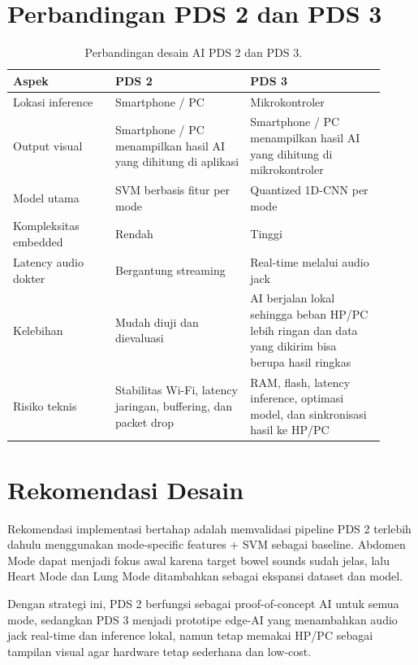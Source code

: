 \documentclass[12pt,a4paper]{article}
\begin{document}
\section{Perbandingan PDS 2 dan PDS 3}
\begin{table}[H]
\centering
\begin{tabular}{p{0.25\linewidth}p{0.33\linewidth}p{0.33\linewidth}}
\toprule
\textbf{Aspek} & \textbf{PDS 2} & \textbf{PDS 3} \\
\midrule
Lokasi inference & Smartphone / PC & Mikrokontroler \\
Output visual & Smartphone / PC menampilkan hasil AI yang dihitung di aplikasi & Smartphone / PC menampilkan hasil AI yang dihitung di mikrokontroler \\
Model utama & SVM berbasis fitur per mode & Quantized 1D-CNN per mode \\
Kompleksitas embedded & Rendah & Tinggi \\
Latency audio dokter & Bergantung streaming & Real-time melalui audio jack \\
Kelebihan & Mudah diuji dan dievaluasi & AI berjalan lokal sehingga beban HP/PC lebih ringan dan data yang dikirim bisa berupa hasil ringkas \\
Risiko teknis & Stabilitas Wi-Fi, latency jaringan, buffering, dan packet drop & RAM, flash, latency inference, optimasi model, dan sinkronisasi hasil ke HP/PC \\
\bottomrule
\end{tabular}
\caption{Perbandingan desain AI PDS 2 dan PDS 3.}
\end{table}

\section{Rekomendasi Desain}
Rekomendasi implementasi bertahap adalah memvalidasi pipeline PDS 2 terlebih dahulu menggunakan mode-specific features + SVM sebagai baseline. Abdomen Mode dapat menjadi fokus awal karena target bowel sounds sudah jelas, lalu Heart Mode dan Lung Mode ditambahkan sebagai ekspansi dataset dan model.

Dengan strategi ini, PDS 2 berfungsi sebagai proof-of-concept AI untuk semua mode, sedangkan PDS 3 menjadi prototipe edge-AI yang menambahkan audio jack real-time dan inference lokal, namun tetap memakai HP/PC sebagai tampilan visual agar hardware tetap sederhana dan low-cost.
\end{document}
